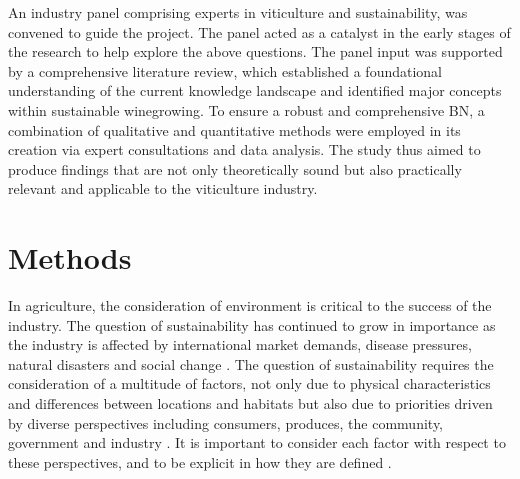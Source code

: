 \documentclass[fleqn,10pt]{wlscirep}
\begin{document}
An industry panel comprising experts in viticulture and sustainability, was convened to guide the project. The panel acted as a catalyst in the early stages of the research to help explore the above questions. The panel input was supported by a comprehensive literature review, which established a foundational understanding of the current knowledge landscape and identified major concepts within sustainable winegrowing. To ensure a robust and comprehensive BN, a combination of qualitative and quantitative methods were employed in its creation via expert consultations and data analysis. The study thus aimed to produce findings that are not only theoretically sound but also practically relevant and applicable to the viticulture industry.

\section{Methods}

In agriculture, the consideration of environment is critical to the success of the industry. The question of sustainability has continued to grow in importance as the industry is affected by international market demands, disease pressures, natural disasters and social change . The question of sustainability requires the consideration of a multitude of factors, not only due to physical characteristics and differences between locations and habitats but also due to priorities driven by diverse perspectives including consumers, produces, the community, government and industry . It is important to consider each factor with respect to these perspectives, and to be explicit in how they are defined .
\end{document}
